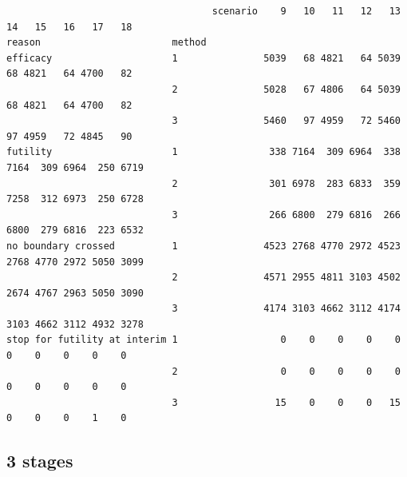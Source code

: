 \documentclass[12pt]{article}
\begin{document}
\begin{verbatim}
                                    scenario    9   10   11   12   13   14   15   16   17   18
reason                       method                                                           
efficacy                     1               5039   68 4821   64 5039   68 4821   64 4700   82
                             2               5028   67 4806   64 5039   68 4821   64 4700   82
                             3               5460   97 4959   72 5460   97 4959   72 4845   90
futility                     1                338 7164  309 6964  338 7164  309 6964  250 6719
                             2                301 6978  283 6833  359 7258  312 6973  250 6728
                             3                266 6800  279 6816  266 6800  279 6816  223 6532
no boundary crossed          1               4523 2768 4770 2972 4523 2768 4770 2972 5050 3099
                             2               4571 2955 4811 3103 4502 2674 4767 2963 5050 3090
                             3               4174 3103 4662 3112 4174 3103 4662 3112 4932 3278
stop for futility at interim 1                  0    0    0    0    0    0    0    0    0    0
                             2                  0    0    0    0    0    0    0    0    0    0
                             3                 15    0    0    0   15    0    0    0    1    0
\end{verbatim}

\clearpage

\subsection{3 stages}
\label{sec:org45e02c4}
\end{document}
